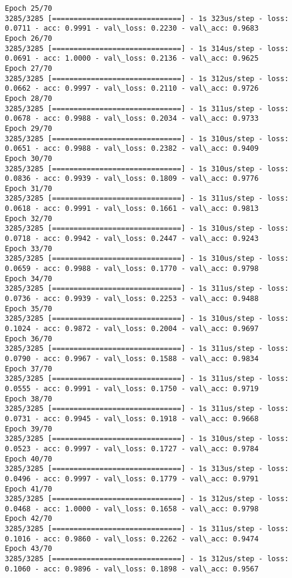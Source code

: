 \documentclass[11pt]{article}
\begin{document}
\begin{Verbatim}[commandchars=\\\{\}]
Epoch 25/70
3285/3285 [==============================] - 1s 323us/step - loss: 0.0711 - acc: 0.9991 - val\_loss: 0.2230 - val\_acc: 0.9683
Epoch 26/70
3285/3285 [==============================] - 1s 314us/step - loss: 0.0691 - acc: 1.0000 - val\_loss: 0.2136 - val\_acc: 0.9625
Epoch 27/70
3285/3285 [==============================] - 1s 312us/step - loss: 0.0662 - acc: 0.9997 - val\_loss: 0.2110 - val\_acc: 0.9726
Epoch 28/70
3285/3285 [==============================] - 1s 311us/step - loss: 0.0678 - acc: 0.9988 - val\_loss: 0.2034 - val\_acc: 0.9733
Epoch 29/70
3285/3285 [==============================] - 1s 310us/step - loss: 0.0651 - acc: 0.9988 - val\_loss: 0.2382 - val\_acc: 0.9409
Epoch 30/70
3285/3285 [==============================] - 1s 310us/step - loss: 0.0836 - acc: 0.9939 - val\_loss: 0.1809 - val\_acc: 0.9776
Epoch 31/70
3285/3285 [==============================] - 1s 311us/step - loss: 0.0618 - acc: 0.9991 - val\_loss: 0.1661 - val\_acc: 0.9813
Epoch 32/70
3285/3285 [==============================] - 1s 310us/step - loss: 0.0718 - acc: 0.9942 - val\_loss: 0.2447 - val\_acc: 0.9243
Epoch 33/70
3285/3285 [==============================] - 1s 310us/step - loss: 0.0659 - acc: 0.9988 - val\_loss: 0.1770 - val\_acc: 0.9798
Epoch 34/70
3285/3285 [==============================] - 1s 311us/step - loss: 0.0736 - acc: 0.9939 - val\_loss: 0.2253 - val\_acc: 0.9488
Epoch 35/70
3285/3285 [==============================] - 1s 310us/step - loss: 0.1024 - acc: 0.9872 - val\_loss: 0.2004 - val\_acc: 0.9697
Epoch 36/70
3285/3285 [==============================] - 1s 311us/step - loss: 0.0790 - acc: 0.9967 - val\_loss: 0.1588 - val\_acc: 0.9834
Epoch 37/70
3285/3285 [==============================] - 1s 311us/step - loss: 0.0555 - acc: 0.9991 - val\_loss: 0.1750 - val\_acc: 0.9719
Epoch 38/70
3285/3285 [==============================] - 1s 311us/step - loss: 0.0731 - acc: 0.9945 - val\_loss: 0.1918 - val\_acc: 0.9668
Epoch 39/70
3285/3285 [==============================] - 1s 310us/step - loss: 0.0523 - acc: 0.9997 - val\_loss: 0.1727 - val\_acc: 0.9784
Epoch 40/70
3285/3285 [==============================] - 1s 313us/step - loss: 0.0496 - acc: 0.9997 - val\_loss: 0.1779 - val\_acc: 0.9791
Epoch 41/70
3285/3285 [==============================] - 1s 312us/step - loss: 0.0468 - acc: 1.0000 - val\_loss: 0.1658 - val\_acc: 0.9798
Epoch 42/70
3285/3285 [==============================] - 1s 311us/step - loss: 0.1016 - acc: 0.9860 - val\_loss: 0.2262 - val\_acc: 0.9474
Epoch 43/70
3285/3285 [==============================] - 1s 312us/step - loss: 0.1060 - acc: 0.9896 - val\_loss: 0.1898 - val\_acc: 0.9567

\end{Verbatim}
\end{document}
